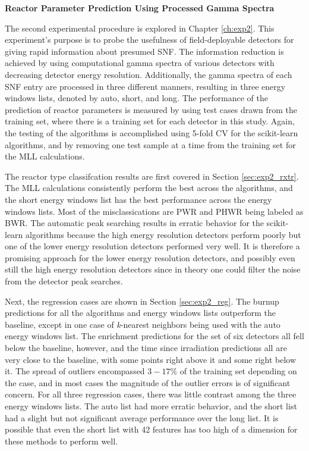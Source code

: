 \noindent \textbf{Reactor Parameter Prediction Using Processed Gamma Spectra}

The second experimental procedure is explored in Chapter \ref{ch:exp2}.  This
experiment's purpose is to probe the usefulness of field-deployable detectors
for giving rapid information about presumed \gls{SNF}. The information
reduction is achieved by using computational gamma spectra of various detectors
with decreasing detector energy resolution.  Additionally, the gamma spectra of
each \gls{SNF} entry are processed in three different manners, resulting in
three energy windows lists, denoted by auto, short, and long.  The performance
of the prediction of reactor parameters is measured by using test cases drawn
from the training set, where there is a training set for each detector in this
study.  Again, the testing of the algorithms is accomplished using 5-fold
\gls{CV} for the scikit-learn algorithms, and by removing one test sample at a
time from the training set for the \gls{MLL} calculations.

The reactor type classifcation results are first covered in Section
\ref{sec:exp2_rxtr}.  The \gls{MLL} calculations consistently perform the best
across the algorithms, and the short energy windows list has the best
performance across the energy windows lists.  Most of the misclassications are
\gls{PWR} and \gls{PHWR} being labeled as \gls{BWR}.  The automatic peak
searching results in erratic behavior for the scikit-learn algorithms because
the high energy resolution detectors perform poorly but one of the lower energy
resolution detectors performed very well. It is therefore a promising approach
for the lower energy resolution detectors, and possibly even still the high
energy resolution detectors since in theory one could filter the noise from the
detector peak searches. 

Next, the regression cases are shown in Section \ref{sec:exp2_reg}.  The burnup
predictions for all the algorithms and energy windows lists outperform the
baseline, except in one case of \textit{k}-nearest neighbors being used with
the auto energy windows list.  The enrichment predictions for the set of six
detectors all fell below the baseline, however, and the time since irradiation
predictions all are very close to the baseline, with some points right above it
and some right below it.  The spread of outliers encompassed $3-17\%$ of the
training set depending on the case, and in most cases the magnitude of the
outlier errors is of significant concern. For all three regression cases, there
was little contrast among the three energy windows lists. The auto list had
more erratic behavior, and the short list had a slight but not significant
average performance over the long list. It is possible that even the short list
with 42 features has too high of a dimension for these methods to perform well. 

